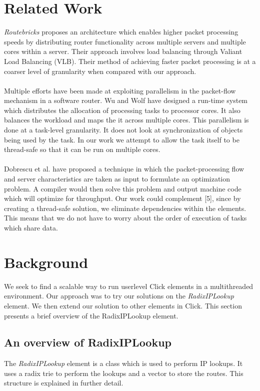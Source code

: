 \documentclass{article}
\begin{document}
\section{Related Work}
\emph{Routebricks} \cite{routebricks} proposes an architecture which enables higher packet processing speeds by distributing router functionality across multiple servers and multiple cores within a server. Their approach involves load balancing through Valiant Load Balancing (VLB). Their method of achieving faster packet processing is at a coarser level of granularity when compared with our approach.
\\\\ Multiple efforts have been made at exploiting parallelism in the packet-flow mechanism in a software router. Wu and Wolf \cite{runtimepacketprocessing} have designed a run-time system which distributes the allocation of processing tasks to processor cores. It also balances the workload and maps the it across multiple cores. This parallelism is done at a task-level granularity. It does not look at synchronization of objects being used by the task. In our work we attempt to allow the task itself to be thread-safe so that it can be run on multiple cores.
\\\\ Dobrescu et al. \cite{dobrescu} have proposed a technique in which the packet-processing flow and server characteristics are taken as input to formulate an optimization problem. A compiler would then solve this problem and output machine code which will optimize for throughput. Our work could complement [5], since by creating a thread-safe solution, we eliminate dependencies within the elements. This means that we do not have to worry about the order of execution of tasks which share data.

\section{Background}
We seek to find a scalable way to run userlevel Click elements in a multithreaded environment. Our approach was to try our solutions on the \emph{RadixIPLookup} element. We then extend our solution to other elements in Click. This section presents a brief overview of the RadixIPLookup element.
\subsection{An overview of RadixIPLookup}
The \emph{RadixIPLookup} element \cite{radixiplookup} is a class which is used to perform IP lookups. It uses a radix trie to perform the lookups and a vector to store the routes. This structure is explained in further detail. 
\end{document}
